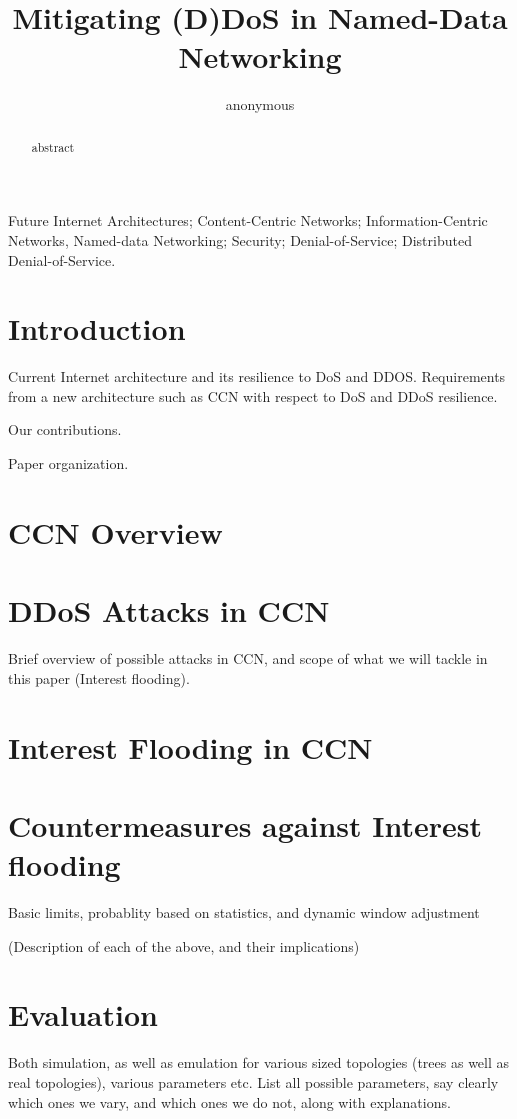 \documentclass[conference]{IEEEtran}
\title{Mitigating (D)DoS in Named-Data Networking}%
\author{anonymous}
\begin{document}
\maketitle

\begin{abstract}
%
abstract
%
\end{abstract}

 Future Internet Architectures;
Content-Centric Networks; Information-Centric Networks, Named-data
Networking; Security; Denial-of-Service; Distributed
Denial-of-Service.

\section{Introduction \label{intro}}
Current Internet architecture and its resilience to DoS and DDOS. Requirements from a new architecture such as CCN with respect to DoS and DDoS resilience.

Our contributions.

Paper organization.

\section{ CCN Overview\label{ccn-intro}}

\section { DDoS Attacks in CCN \label{ccn-ddos}}
Brief overview of possible attacks in CCN, and scope of what we will tackle in this paper (Interest flooding).

\section { Interest Flooding in CCN }

\section {Countermeasures against Interest flooding}

Basic limits, probablity based on statistics, and dynamic window adjustment

(Description of each of the above, and their implications) 


\section {Evaluation}
 Both simulation, as well as emulation for various sized topologies (trees as well as real topologies), various parameters etc.
List all possible parameters, say clearly which ones we vary, and which ones we do not, along with explanations.
\end{document}
